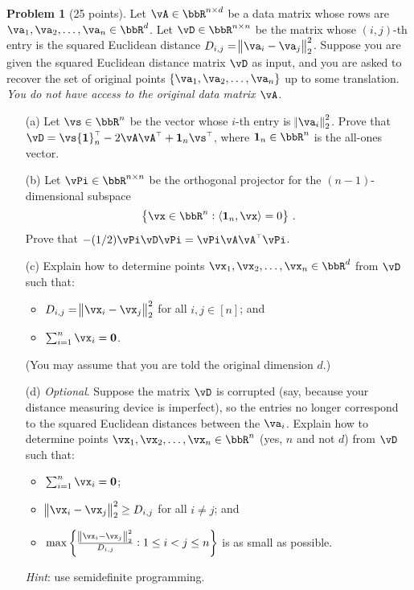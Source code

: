 \documentclass[11pt]{article}
\renewcommand\v[1]{{\ensuremath{\boldsymbol{#1}}}}
\renewcommand\t{{\ensuremath{\scriptscriptstyle{\top}}}}
\newcommand\ip[1]{\langle #1 \rangle} %
\theoremstyle{definition}
\newtheorem{problem}{Problem}
\begin{document}
\begin{problem}[25 points]
  Let $\vA \in \bbR^{n \times d}$ be a data matrix whose rows are
  $\va_1, \va_2, \dotsc, \va_n \in \bbR^d$.
  Let $\vD \in \bbR^{n \times n}$ be the matrix whose $(i,j)$-th entry
  is the squared Euclidean distance $D_{i,j} =
  \norm{\va_i-\va_j}_2^2$.
  Suppose you are given the squared Euclidean distance matrix $\vD$ as
  input, and you are asked to recover the set of original points
  $\cbr[0]{ \va_1, \va_2, \dotsc, \va_n }$ up to some translation.
  \emph{You do not have access to the original data matrix $\vA$.}
  \begin{enumerate}
    \item[(a)]
      Let $\vs \in \bbR^n$ be the vector whose $i$-th entry is
      $\norm{\va_i}_2^2$.
      Prove that $\vD = \vs\v1_n^\t - 2\vA\vA^\t + \v1_n\vs^\t$, where
      $\v1_n \in \bbR^n$ is the all-ones vector.

    \item[(b)]
      Let $\vPi \in \bbR^{n \times n}$ be the orthogonal projector for
      the $(n{-}1)$-dimensional subspace
      \begin{equation*}
        \cbr{ \vx \in \bbR^n : \ip{\v1_n,\vx} = 0 }
        \,.
      \end{equation*}
      Prove that $-(1/2)\vPi\vD\vPi = \vPi\vA\vA^\t\vPi$.

    \item[(c)]
      Explain how to determine points $\vx_1, \vx_2, \dotsc, \vx_n \in \bbR^d$
      from $\vD$ such that:
      \begin{itemize}
        \item
          $D_{i,j} = \norm{\vx_i-\vx_j}_2^2$ for all $i,j \in [n]$;
          and

        \item
          $\sum_{i=1}^n \vx_i = \v0$.

      \end{itemize}
      (You may assume that you are told the original dimension $d$.)

    \item[(d)]
      \emph{Optional}.
      Suppose the matrix $\vD$ is corrupted (say, because your distance
      measuring device is imperfect), so the entries no longer correspond to
      the squared Euclidean distances between the $\va_i$.
      Explain how to determine points $\vx_1, \vx_2, \dotsc, \vx_n \in \bbR^n$
      (yes, $n$ and not $d$) from $\vD$ such that:
      \begin{itemize}
        \item
          $\sum_{i=1}^n \vx_i = \v0$;
        \item
          $\norm{\vx_i - \vx_j}_2^2 \geq D_{i,j}$ for all $i \neq j$; and
        \item
          $\max \cbr{ \frac{ \norm{\vx_i - \vx_j}_2^2 }{D_{i,j}} : 1 \leq i < j \leq n }$ is as small as possible.
      \end{itemize}
      \emph{Hint}: use semidefinite programming.

  \end{enumerate}
\end{problem}
\end{document}
